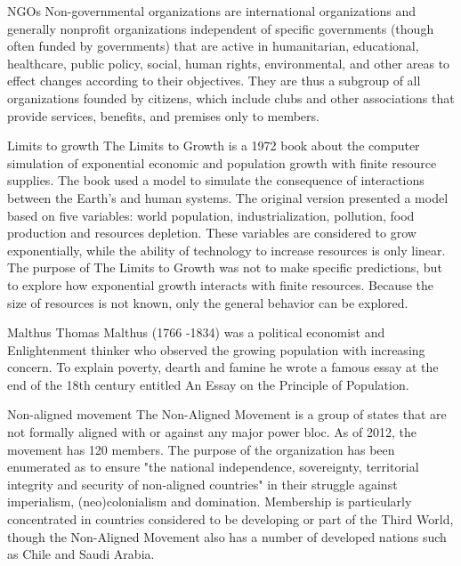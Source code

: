 \begin{sortEnvironment}{NGOs}
Non-governmental organizations are international organizations and generally nonprofit organizations independent of specific governments (though often funded by governments) that are active in humanitarian, educational, healthcare, public policy, social, human rights, environmental, and other areas to effect changes according to their objectives. They are thus a subgroup of all organizations founded by citizens, which include clubs and other associations that provide services, benefits, and premises only to members.
\end{sortEnvironment}

\begin{sortEnvironment}{Limits to growth}
The Limits to Growth is a 1972 book about the computer simulation of exponential economic and population growth with finite resource supplies. The book used a model to simulate the consequence of interactions between the Earth's and human systems. The original version presented a model based on five variables: world population, industrialization, pollution, food production and resources depletion. These variables are considered to grow exponentially, while the ability of technology to increase resources is only linear. The purpose of The Limits to Growth was not to make specific predictions, but to explore how exponential growth interacts with finite resources. Because the size of resources is not known, only the general behavior can be explored.
\end{sortEnvironment}

\begin{sortEnvironment}{Malthus}
Thomas Malthus (1766 -1834) was a political economist and Enlightenment thinker who observed the growing population with increasing concern. To explain poverty, dearth and famine he wrote a famous essay at the end of the 18th century entitled An Essay on the Principle of Population. 
\end{sortEnvironment}

\begin{sortEnvironment}{Non-aligned movement}
The Non-Aligned Movement is a group of states that are not formally aligned with or against any major power bloc. As of 2012, the movement has 120 members. The purpose of the organization has been enumerated as to ensure "the national independence, sovereignty, territorial integrity and security of non-aligned countries" in their struggle against imperialism, (neo)colonialism and domination. Membership is particularly concentrated in countries considered to be developing or part of the Third World, though the Non-Aligned Movement also has a number of developed nations such as Chile and Saudi Arabia.
\end{sortEnvironment}


